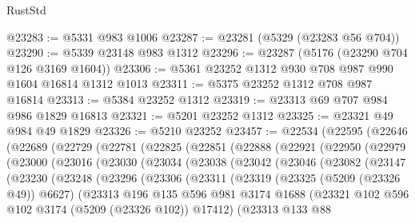 \begin{lexlean}{RustStd}
\begin{coremodule}
@23283 := @5331 @983 @1006
@23287 := @23281 (@5329 (@23283 @56 @704))
@23290 := @5339 @23148 @983 @1312
@23296 := @23287 (@5176 (@23290 @704 @126 @3169 @1604))
@23306 := @5361 @23252 @1312 @930 @708 @987 @990 @1604 @16814 @1312 @1013
@23311 := @5375 @23252 @1312 @708 @987 @16814
@23313 := @5384 @23252 @1312
@23319 := @23313 @69 @707 @984 @986 @1829 @16813
@23321 := @5201 @23252 @1312
@23325 := @23321 @49 @984 @49 @1829
@23326 := @5210 @23252
@23457 := @22534
    (@22595
      (@22646
        (@22689
          (@22729
            (@22781
              (@22825
                (@22851
                  (@22888
                    (@22921
                      (@22950
                        (@22979
                          (@23000
                            (@23016
                              (@23030
                                (@23034
                                  (@23038
                                    (@23042
                                      (@23046
                                        (@23082
                                          (@23147
                                            (@23230
                                              (@23248
                                                (@23296
                                                  (@23306
                                                    (@23311
                                                      (@23319
                                                        (@23325 (@5209 (@23326 @49)) @6627)
                                                        (@23313
                                                          @196
                                                          @135
                                                          @596
                                                          @981
                                                          @3174
                                                          @1688
                                                          (@23321
                                                            @102
                                                            @596
                                                            @102
                                                            @3174
                                                            (@5209 (@23326 @102))
                                                            @17412)
                                                          (@23313
                                                            @133
                                                            @88

\end{coremodule}
\end{lexlean}
